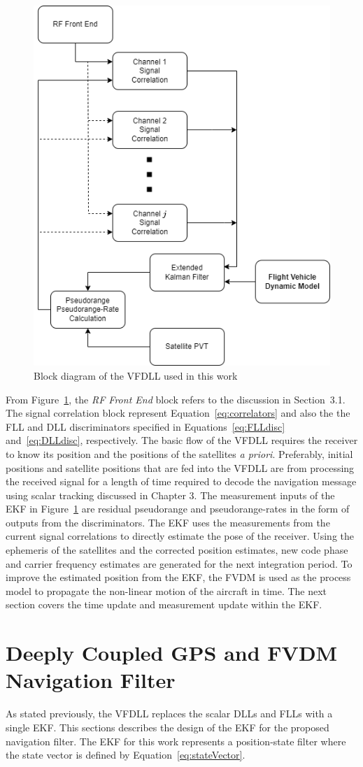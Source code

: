 \begin{figure}[!ht]
    \centering
    \includegraphics[width=0.45\linewidth]{Figures/VectorTracking.drawio.png}
    \caption{Block diagram of the VFDLL used in this work}\label{fig:VFDLL}
\end{figure}

From Figure~\ref{fig:VFDLL}, the \textit{RF Front End} block refers to the discussion in Section~3.1. The signal correlation block represent Equation~\ref{eq:correlators} and also the the FLL and DLL discriminators specified in Equations~\ref{eq:FLLdisc} and~\ref{eq:DLLdisc}, respectively. The basic flow of the VFDLL requires the receiver to know its position and the positions of the satellites \textit{a priori}. Preferably, initial positions and satellite positions that are fed into the VFDLL are from processing the received signal for a length of time required to decode the navigation message using scalar tracking discussed in Chapter 3. The measurement inputs of the EKF in Figure~\ref{fig:VFDLL} are residual pseudorange and pseudorange-rates in the form of outputs from the discriminators. The EKF uses the measurements from the current signal correlations to directly estimate the pose of the receiver. Using the ephemeris of the satellites and the corrected position estimates, new code phase and carrier frequency estimates are generated for the next integration period. To improve the estimated position from the EKF, the FVDM is used as the process model to propagate the non-linear motion of the aircraft in time. The next section covers the time update and measurement update within the EKF\@.

\section{\textbf{Deeply Coupled GPS and FVDM Navigation Filter}}
As stated previously, the VFDLL replaces the scalar DLLs and FLLs with a single EKF\@. This sections describes the design of the EKF for the proposed navigation filter. The EKF for this work represents a position-state filter where the state vector is defined by Equation~\ref{eq:stateVector}.


